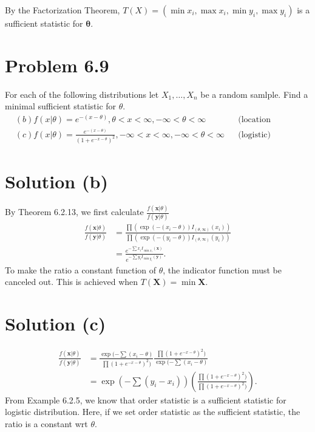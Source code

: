 \documentclass{article} %
\newcommand{\sample}[1]{#1_1 , \dots , #1_n}
\newcommand{\solution}[1]{\section*{Solution #1}}
\begin{document}
By the Factorization Theorem, $T(X) = (\min x_i, \max x_i, \min y_i, \max y_i)$ is a sufficient statistic for $\boldsymbol \theta$.

\section*{Problem 6.9}
For each of the following distributions let $\sample{X}$ be a random samlple. Find a minimal sufficient statistic for $\theta$.
\begin{align*}
        &(b) f(x|\theta) = e^{-(x - \theta)}, \theta < x < \infty, -\infty < \theta < \infty && \text{(location exponential)} \\
        &(c) f(x|\theta) = \frac{e^{-(x - \theta)}}{(1 + e^{-x-\theta})^2}, -\infty < x < \infty, -\infty < \theta < \infty && \text{(logistic)}
\end{align*} 


\solution{(b)}
By Theorem 6.2.13, we first calculate $\frac{f(\boldsymbol x| \theta)}{f(\boldsymbol y| \theta)}$
\begin{align*}
    \frac{f(\boldsymbol x| \theta)}{f(\boldsymbol y| \theta)} &= \frac{\prod (\exp(-(x_i-\theta))I_{(\theta, \infty)}(x_i))}{\prod (\exp(-(y_i-\theta))I_{(\theta, \infty)}(y_i))} \\
    &= \frac{e^{-\sum x_i I_{\min x_i}(\boldsymbol x)}}{e^{-\sum y_i I_{\min y_i}(\boldsymbol y)}}.
\end{align*}
To make the ratio a constant function of $\theta$, the indicator function must be canceled out. This is achieved when $T(\boldsymbol X) = \min \boldsymbol X$.

\solution{(c)}

\begin{align*}
    \frac{f(\boldsymbol x| \theta)}{f(\boldsymbol y| \theta)} &= \frac{\exp(-\sum(x_i-\theta)}{\prod (1 + e^{-x-\theta})^2)} \frac{\prod (1 + e^{-x-\theta})^2)}{\exp(-\sum(x_i-\theta)} \\
    &= \exp (- \sum (y_i - x_i)) (\frac{\prod (1 + e^{-x-\theta})^2)}{\prod (1 + e^{-x-\theta})^2)}).
\end{align*}
From Example 6.2.5, we know that order statistic is a sufficient statistic for logistic distribution. Here, if we set order statistic as the sufficient statistic, the ratio is a constant wrt $\theta$.
\end{document}
